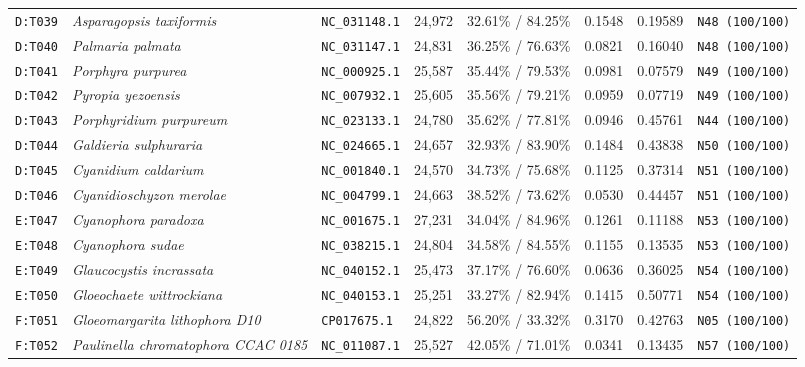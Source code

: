 \documentclass[10pt,letterpaper]{article}
\begin{document}
\begin{longtable}{llllllll}
\texttt{D:T039} & \textit{Asparagopsis taxiformis} & \texttt{NC\_031148.1} & 24,972 & 32.61\% / 84.25\% & 0.1548 & 0.19589 & \texttt{N48 (100/100)} \\
\texttt{D:T040} & \textit{Palmaria palmata} & \texttt{NC\_031147.1} & 24,831 & 36.25\% / 76.63\% & 0.0821 & 0.16040 & \texttt{N48 (100/100)} \\
\texttt{D:T041} & \textit{Porphyra purpurea} & \texttt{NC\_000925.1} & 25,587 & 35.44\% / 79.53\% & 0.0981 & 0.07579 & \texttt{N49 (100/100)} \\
\texttt{D:T042} & \textit{Pyropia yezoensis} & \texttt{NC\_007932.1} & 25,605 & 35.56\% / 79.21\% & 0.0959 & 0.07719 & \texttt{N49 (100/100)} \\
\texttt{D:T043} & \textit{Porphyridium purpureum} & \texttt{NC\_023133.1} & 24,780 & 35.62\% / 77.81\% & 0.0946 & 0.45761 & \texttt{N44 (100/100)} \\
\texttt{D:T044} & \textit{Galdieria sulphuraria} & \texttt{NC\_024665.1} & 24,657 & 32.93\% / 83.90\% & 0.1484 & 0.43838 & \texttt{N50 (100/100)} \\
\texttt{D:T045} & \textit{Cyanidium caldarium} & \texttt{NC\_001840.1} & 24,570 & 34.73\% / 75.68\% & 0.1125 & 0.37314 & \texttt{N51 (100/100)} \\
\texttt{D:T046} & \textit{Cyanidioschyzon merolae} & \texttt{NC\_004799.1} & 24,663 & 38.52\% / 73.62\% & 0.0530 & 0.44457 & \texttt{N51 (100/100)} \\
\texttt{E:T047} & \textit{Cyanophora paradoxa} & \texttt{NC\_001675.1} & 27,231 & 34.04\% / 84.96\% & 0.1261 & 0.11188 & \texttt{N53 (100/100)} \\
\texttt{E:T048} & \textit{Cyanophora sudae} & \texttt{NC\_038215.1} & 24,804 & 34.58\% / 84.55\% & 0.1155 & 0.13535 & \texttt{N53 (100/100)} \\
\texttt{E:T049} & \textit{Glaucocystis incrassata} & \texttt{NC\_040152.1} & 25,473 & 37.17\% / 76.60\% & 0.0636 & 0.36025 & \texttt{N54 (100/100)} \\
\texttt{E:T050} & \textit{Gloeochaete wittrockiana} & \texttt{NC\_040153.1} & 25,251 & 33.27\% / 82.94\% & 0.1415 & 0.50771 & \texttt{N54 (100/100)} \\
\texttt{F:T051} & \textit{Gloeomargarita lithophora D10} & \texttt{CP017675.1} & 24,822 & 56.20\% / 33.32\% & 0.3170 & 0.42763 & \texttt{N05 (100/100)} \\
\texttt{F:T052} & \textit{Paulinella chromatophora CCAC 0185} & \texttt{NC\_011087.1} & 25,527 & 42.05\% / 71.01\% & 0.0341 & 0.13435 & \texttt{N57 (100/100)} \\

\end{longtable}
\end{document}
